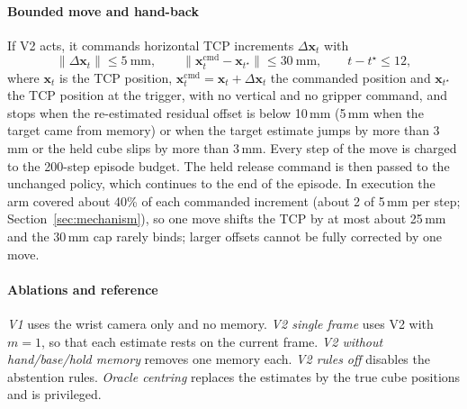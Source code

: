 \paragraph{Bounded move and hand-back} If V2 acts, it commands horizontal TCP increments $\Delta\mathbf{x}_t$ with
\begin{equation}
\|\Delta\mathbf{x}_t\|\le 5\ \mathrm{mm},\qquad \|\mathbf{x}^{\mathrm{cmd}}_t-\mathbf{x}_{t^\star}\|\le 30\ \mathrm{mm},\qquad t-t^\star\le 12,
\end{equation}
where $\mathbf{x}_t$ is the TCP position, $\mathbf{x}^{\mathrm{cmd}}_t=\mathbf{x}_t+\Delta\mathbf{x}_t$ the commanded position and $\mathbf{x}_{t^\star}$ the TCP position at the trigger, with no vertical and no gripper command, and stops when the re-estimated residual offset is below 10\,mm (5\,mm when the target came from memory) or when the target estimate jumps by more than 3\,mm or the held cube slips by more than 3\,mm. Every step of the move is charged to the 200-step episode budget. The held release command is then passed to the unchanged policy, which continues to the end of the episode. In execution the arm covered about 40\% of each commanded increment (about 2 of 5\,mm per step; Section~\ref{sec:mechanism}), so one move shifts the TCP by at most about 25\,mm and the 30\,mm cap rarely binds; larger offsets cannot be fully corrected by one move.

\paragraph{Ablations and reference} \emph{V1} uses the wrist camera only and no memory. \emph{V2 single frame} uses V2 with $m=1$, so that each estimate rests on the current frame. \emph{V2 without hand/base/hold memory} removes one memory each. \emph{V2 rules off} disables the abstention rules. \emph{Oracle centring} replaces the estimates by the true cube positions and is privileged.

